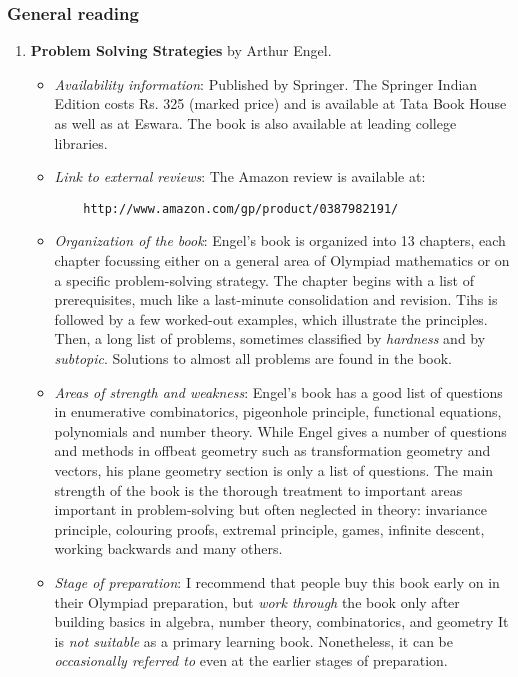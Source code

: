 \documentclass[a4paper]{amsart}
\begin{document}
\subsubsection{General reading}

\begin{enumerate}

\item {\bf Problem Solving Strategies} by Arthur Engel. 
  
  \begin{itemize}

  \item {\em Availability information}: Published by Springer.
    The Springer Indian Edition costs Rs. 325 (marked price) and is available
    at Tata Book House as well as at Eswara. The book is also available at leading college libraries.

  \item {\em Link to external reviews}: The Amazon review is available at:
\begin{verbatim}
    http://www.amazon.com/gp/product/0387982191/
\end{verbatim}

  \item {\em Organization of the book}: Engel's book is organized into 13 chapters,
    each chapter focussing either on a general area of Olympiad mathematics or on a specific
    problem-solving strategy. The chapter begins with a list of prerequisites, much like a last-minute
    consolidation and revision. Tihs is followed by a few worked-out examples, which illustrate the principles.
    Then, a long list of problems, sometimes classified by {\em hardness} and by {\em subtopic}. Solutions
    to almost all problems are found in the book.

  \item {\em Areas of strength and weakness}: Engel's book has a good
    list of questions in enumerative combinatorics, pigeonhole
    principle, functional equations, polynomials and number theory.
    While Engel gives a number of questions and methods in offbeat
    geometry such as transformation geometry and vectors, his plane
    geometry section is only a list of questions. The main strength of
    the book is the thorough treatment to important areas important in
    problem-solving but often neglected in theory: invariance
    principle, colouring proofs, extremal principle, games, infinite descent, working
    backwards and many others.

  \item {\em Stage of preparation}: I recommend that people buy this book early on in their Olympiad preparation, but
    {\em work through} the book only after building basics in algebra, number theory, combinatorics, and geometry
    It is {\em not suitable} as a primary learning book. Nonetheless, it can be {\em occasionally referred to} even at the earlier
    stages of preparation.


\end{itemize}
\end{enumerate}
\end{document}
